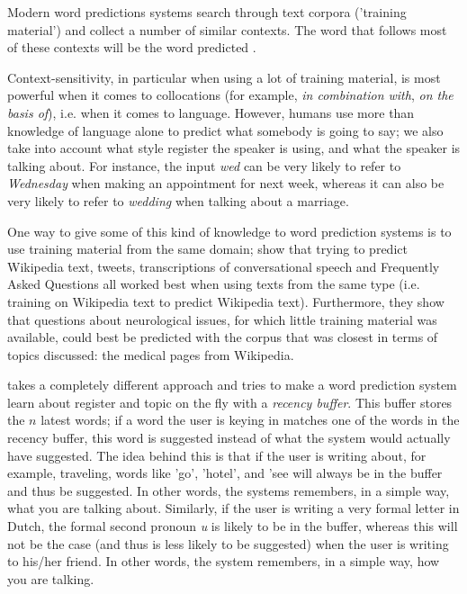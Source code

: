 \documentclass[12pt]{article}
\begin{document}
Modern word predictions systems search through text corpora ('training material') and collect a number of similar contexts. The word that follows most of these contexts will be the word predicted \cite[among others]{vandenbosch+08}. 


Context-sensitivity, in particular when using a lot of training material, is most powerful when it comes to collocations (for example, \emph{in combination with}, \emph{on the basis of}), i.e. when it comes to language. However, humans use more than knowledge of language alone to predict what somebody is going to say; we also take into account what style register the speaker is using, and what the speaker is talking about. For instance, the input \emph{wed} can be very likely to refer to \emph{Wednesday} when making an appointment for next week, whereas it can also be very likely to refer to \emph{wedding} when talking about a marriage. 

One way to give some of this kind of knowledge to word prediction systems is to use training material from the same domain;  show that trying to predict Wikipedia text, tweets, transcriptions of conversational speech and Frequently Asked Questions all worked best when using texts from the same type (i.e. training on Wikipedia text to predict Wikipedia text). Furthermore, they show that questions about neurological issues, for which little training material was available, could best be predicted with the corpus that was closest in terms of topics discussed: the medical pages from Wikipedia. 

 takes a completely different approach and tries to make a word prediction system learn about register and topic on the fly with a \emph{recency buffer}. This buffer stores the $n$ latest words; if a word the user is keying in matches one of the words in the recency buffer, this word is suggested instead of what the system would actually have suggested. The idea behind this is that if the user is writing about, for example, traveling, words like 'go', 'hotel', and 'see  will always be in the buffer and thus be suggested. In other words, the systems remembers, in a simple way, what you are talking about. Similarly, if the user is writing a very formal letter in Dutch, the formal second pronoun \emph{u} is likely to be in the buffer, whereas this will not be the case (and thus is less likely to be suggested) when the user is writing to his/her friend. In other words, the system remembers, in a simple way, how you are talking.
\end{document}
